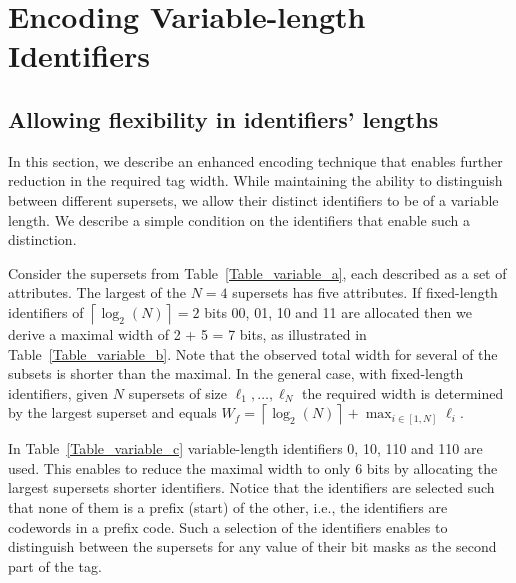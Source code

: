 \section{Encoding Variable-length Identifiers}\label{sec:identifiers}
\subsection{Allowing flexibility in identifiers' lengths}
In this section, we describe an enhanced encoding technique that enables further reduction in the required tag width.  While maintaining the ability to distinguish between different supersets, we allow their distinct identifiers to be of a variable length. We describe a simple condition on the identifiers that enable such a distinction. 

Consider the supersets from Table~\ref{Table_variable_a}, each described as a set of attributes. The largest of the $N=4$ supersets has five attributes. 
If fixed-length identifiers of $\left \lceil \log_2(N) \right \rceil = 2$ bits 00, 01, 10 and 11 are allocated then we derive a maximal width of 2 + 5 = 7 bits, as illustrated in Table~\ref{Table_variable_b}. 
Note that the observed total width for several of the subsets is shorter than the maximal.
In the general case, with fixed-length identifiers, given $N$ supersets of size $\ell_1, \ldots, \ell_N$ the required width is determined by the largest superset and equals 
 $W_{f} = \left \lceil \log_2(N) \right \rceil + \max_{i \in [1,N]} \ell_i$. 

In Table~\ref{Table_variable_c} variable-length identifiers 0, 10, 110 and 110 are used. This enables to reduce the maximal width to only 6 bits by allocating the largest supersets shorter identifiers. 
Notice that the identifiers are selected such that none of them is a prefix (start) of the other, i.e., the identifiers are codewords in a prefix code.
Such a selection of the identifiers enables to distinguish between the supersets for any value of their bit masks as the second part of the tag. 



%
%








